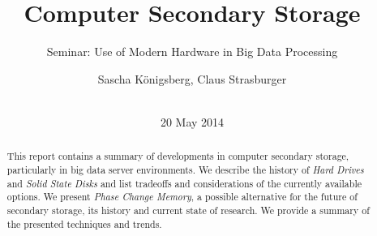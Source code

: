 \documentclass{acm_proc_article-sp}
\begin{document}
\title{Computer Secondary Storage}
\subtitle{Seminar: Use of Modern Hardware in Big Data Processing}

\author{
\alignauthor
Sascha K{\"o}nigsberg, Claus Strasburger\\
       \\
}

\date{20 May 2014}

\maketitle
\begin{abstract}
This report contains a summary of developments in computer secondary storage, particularly in big data server environments. We describe the history of \emph{Hard Drives} and \emph{Solid State Disks} and list tradeoffs and considerations of the currently available options. We present \emph{Phase Change Memory}, a possible alternative for the future of secondary storage, its history and current state of research. We provide a summary of the presented techniques and trends.%
\end{abstract}
\end{document}
